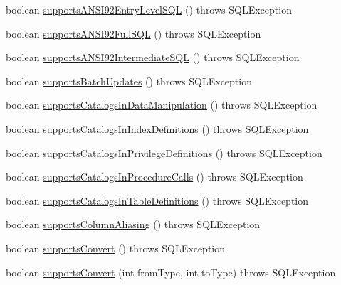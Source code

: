 \begin{DoxyCompactItemize}
boolean \mbox{\hyperlink{classcom_1_1mysql_1_1cj_1_1jdbc_1_1_database_meta_data_a34b29fe8f01d78623b42410f19f1110f}{supports\+A\+N\+S\+I92\+Entry\+Level\+S\+QL}} ()  throws S\+Q\+L\+Exception 
\item 
boolean \mbox{\hyperlink{classcom_1_1mysql_1_1cj_1_1jdbc_1_1_database_meta_data_a76db37b57dc6a13d073fe31933307379}{supports\+A\+N\+S\+I92\+Full\+S\+QL}} ()  throws S\+Q\+L\+Exception 
\item 
boolean \mbox{\hyperlink{classcom_1_1mysql_1_1cj_1_1jdbc_1_1_database_meta_data_a5229b0ed9296ddda4258011ae91ce66f}{supports\+A\+N\+S\+I92\+Intermediate\+S\+QL}} ()  throws S\+Q\+L\+Exception 
\item 
boolean \mbox{\hyperlink{classcom_1_1mysql_1_1cj_1_1jdbc_1_1_database_meta_data_a041b9176d3917e85a93b3b3b5948c56d}{supports\+Batch\+Updates}} ()  throws S\+Q\+L\+Exception 
\item 
boolean \mbox{\hyperlink{classcom_1_1mysql_1_1cj_1_1jdbc_1_1_database_meta_data_a4109a9f9e7ab66587ac396b2283fc056}{supports\+Catalogs\+In\+Data\+Manipulation}} ()  throws S\+Q\+L\+Exception 
\item 
boolean \mbox{\hyperlink{classcom_1_1mysql_1_1cj_1_1jdbc_1_1_database_meta_data_ad7ef9e76b46b628b341502e856bf7cae}{supports\+Catalogs\+In\+Index\+Definitions}} ()  throws S\+Q\+L\+Exception 
\item 
boolean \mbox{\hyperlink{classcom_1_1mysql_1_1cj_1_1jdbc_1_1_database_meta_data_acee80a8f185e02074a5c218e8260ecbe}{supports\+Catalogs\+In\+Privilege\+Definitions}} ()  throws S\+Q\+L\+Exception 
\item 
boolean \mbox{\hyperlink{classcom_1_1mysql_1_1cj_1_1jdbc_1_1_database_meta_data_a9246ab9246c1722116c8003efd6d3d31}{supports\+Catalogs\+In\+Procedure\+Calls}} ()  throws S\+Q\+L\+Exception 
\item 
boolean \mbox{\hyperlink{classcom_1_1mysql_1_1cj_1_1jdbc_1_1_database_meta_data_adc723857f7f9a48c5f4257126a8c1534}{supports\+Catalogs\+In\+Table\+Definitions}} ()  throws S\+Q\+L\+Exception 
\item 
boolean \mbox{\hyperlink{classcom_1_1mysql_1_1cj_1_1jdbc_1_1_database_meta_data_ac53c31cb08e612553dec9e80a8008133}{supports\+Column\+Aliasing}} ()  throws S\+Q\+L\+Exception 
\item 
boolean \mbox{\hyperlink{classcom_1_1mysql_1_1cj_1_1jdbc_1_1_database_meta_data_afabf2d6ef6b7cb8066fb868dee34deec}{supports\+Convert}} ()  throws S\+Q\+L\+Exception 
\item 
boolean \mbox{\hyperlink{classcom_1_1mysql_1_1cj_1_1jdbc_1_1_database_meta_data_a99dceafab56ac009b79270e48c6e47ab}{supports\+Convert}} (int from\+Type, int to\+Type)  throws S\+Q\+L\+Exception 

\end{DoxyCompactItemize}
